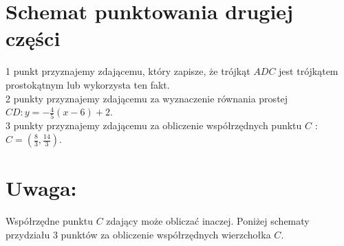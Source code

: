 \documentclass[10pt]{article}
\begin{document}
\section*{Schemat punktowania drugiej części}
1 punkt przyznajemy zdającemu, który zapisze, że trójkąt $A D C$ jest trójkątem prostokątnym lub wykorzysta ten fakt.\\
2 punkty przyznajemy zdającemu za wyznaczenie równania prostej $C D: y=-\frac{4}{5}(x-6)+2$.\\
3 punkty przyznajemy zdającemu za obliczenie współrzędnych punktu $C$ : $C=\left(\frac{8}{3}, \frac{14}{3}\right)$.

\section*{Uwaga:}
Współrzędne punktu $C$ zdający może obliczać inaczej. Poniżej schematy przydziału 3 punktów za obliczenie współrzędnych wierzchołka $C$.
\end{document}
